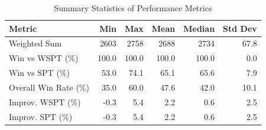 \begin{table}[htbp]%
\centering%
\begin{tabular}{lrrrrr}%
\toprule%
\textbf{Metric}&\textbf{Min}&\textbf{Max}&\textbf{Mean}&\textbf{Median}&\textbf{Std Dev}\\%
\midrule%
Weighted Sum&2603&2758&2688&2734&67.8\\%
Win vs WSPT (\%)&100.0&100.0&100.0&100.0&0.0\\%
Win vs SPT (\%)&53.0&74.1&65.1&65.6&7.9\\%
Overall Win Rate (\%)&35.0&60.0&47.6&42.0&10.1\\%
Improv. WSPT (\%)&-0.3&5.4&2.2&0.6&2.5\\%
Improv. SPT (\%)&-0.3&5.4&2.2&0.6&2.5\\%
\bottomrule%
\end{tabular}%
\caption{Summary Statistics of Performance Metrics}%
\label{tab:metrics}%
\end{table}